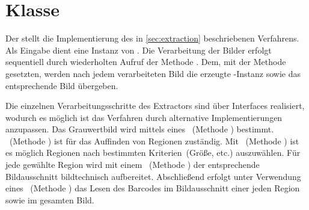 \section{Klasse }
Der  stellt die Implementierung des in \autoref{sec:extraction} beschriebenen Verfahrens.
Als Eingabe dient eine Instanz von .
Die Verarbeitung der Bilder erfolgt sequentiell durch wiederholten Aufruf der Methode .
Dem, mit der Methode  gesetzten,  werden nach jedem verarbeiteten Bild die erzeugte -Instanz sowie das entsprechende Bild übergeben.

Die einzelnen Verarbeitungsschritte des Extractors sind über Interfaces realisiert, wodurch es möglich ist das Verfahren durch alternative Implementierungen anzupassen.
Das Grauwertbild wird mittels eines ~(Methode ) bestimmt.
~(Methode ) ist für das Auffinden von Regionen zuständig.
Mit ~(Methode ) ist es möglich Regionen nach bestimmten Kriterien~(Größe, etc.) auszuwählen.
Für jede gewählte Region wird mit einem ~(Methode ) der entsprechende Bildausschnitt bildtechnisch aufbereitet.
Abschließend erfolgt unter Verwendung eines ~(Methode ) das Lesen des Barcodes im Bildausschnitt einer jeden Region sowie im gesamten Bild.








